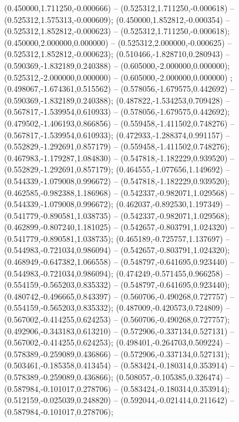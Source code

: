  (0.450000,1.711250,-0.000666) -- (0.525312,1.711250,-0.000618) -- (0.525312,1.575313,-0.000609);
 (0.450000,1.852812,-0.000354) -- (0.525312,1.852812,-0.000623) -- (0.525312,1.711250,-0.000618);
 (0.450000,2.000000,0.000000) -- (0.525312,2.000000,-0.000625) -- (0.525312,1.852812,-0.000623);
 (0.510466,-1.828710,0.280943) -- (0.590369,-1.832189,0.240388) -- (0.605000,-2.000000,0.000000);
 (0.525312,-2.000000,0.000000) -- (0.605000,-2.000000,0.000000) ;
 (0.498067,-1.674361,0.515562) -- (0.578056,-1.679575,0.442692) -- (0.590369,-1.832189,0.240388);
 (0.487822,-1.534253,0.709428) -- (0.567817,-1.539954,0.610933) -- (0.578056,-1.679575,0.442692);
 (0.479502,-1.406193,0.866856) -- (0.559458,-1.411502,0.748276) -- (0.567817,-1.539954,0.610933);
 (0.472933,-1.288374,0.991157) -- (0.552829,-1.292691,0.857179) -- (0.559458,-1.411502,0.748276);
 (0.467983,-1.179287,1.084830) -- (0.547818,-1.182229,0.939520) -- (0.552829,-1.292691,0.857179);
 (0.464555,-1.077656,1.149692) -- (0.544339,-1.079008,0.996672) -- (0.547818,-1.182229,0.939520);
 (0.462585,-0.982388,1.186968) -- (0.542337,-0.982071,1.029568) -- (0.544339,-1.079008,0.996672);
 (0.462037,-0.892530,1.197349) -- (0.541779,-0.890581,1.038735) -- (0.542337,-0.982071,1.029568);
 (0.462899,-0.807240,1.181025) -- (0.542657,-0.803791,1.024320) -- (0.541779,-0.890581,1.038735);
 (0.465189,-0.725757,1.137697) -- (0.544983,-0.721034,0.986094) -- (0.542657,-0.803791,1.024320);
 (0.468949,-0.647382,1.066558) -- (0.548797,-0.641695,0.923440) -- (0.544983,-0.721034,0.986094);
 (0.474249,-0.571455,0.966258) -- (0.554159,-0.565203,0.835332) -- (0.548797,-0.641695,0.923440);
 (0.480742,-0.496665,0.843397) -- (0.560706,-0.490268,0.727757) -- (0.554159,-0.565203,0.835332);
 (0.487009,-0.420573,0.724809) -- (0.567002,-0.414255,0.624253) -- (0.560706,-0.490268,0.727757);
 (0.492906,-0.343183,0.613210) -- (0.572906,-0.337134,0.527131) -- (0.567002,-0.414255,0.624253);
 (0.498401,-0.264703,0.509224) -- (0.578389,-0.259089,0.436866) -- (0.572906,-0.337134,0.527131);
 (0.503461,-0.185358,0.413454) -- (0.583424,-0.180314,0.353914) -- (0.578389,-0.259089,0.436866);
 (0.508057,-0.105385,0.326474) -- (0.587984,-0.101017,0.278706) -- (0.583424,-0.180314,0.353914);
 (0.512159,-0.025039,0.248820) -- (0.592044,-0.021414,0.211642) -- (0.587984,-0.101017,0.278706);
